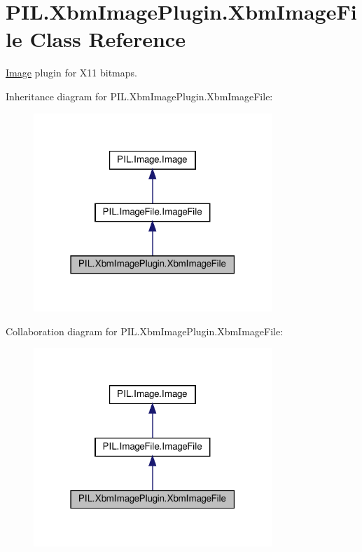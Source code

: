 \hypertarget{classPIL_1_1XbmImagePlugin_1_1XbmImageFile}{}\section{P\+I\+L.\+Xbm\+Image\+Plugin.\+Xbm\+Image\+File Class Reference}
\label{classPIL_1_1XbmImagePlugin_1_1XbmImageFile}


\hyperlink{namespacePIL_1_1Image}{Image} plugin for X11 bitmaps.  




Inheritance diagram for P\+I\+L.\+Xbm\+Image\+Plugin.\+Xbm\+Image\+File\+:
\nopagebreak
\begin{figure}[H]
\begin{center}
\leavevmode
\includegraphics[width=255pt]{classPIL_1_1XbmImagePlugin_1_1XbmImageFile__inherit__graph}
\end{center}
\end{figure}


Collaboration diagram for P\+I\+L.\+Xbm\+Image\+Plugin.\+Xbm\+Image\+File\+:
\nopagebreak
\begin{figure}[H]
\begin{center}
\leavevmode
\includegraphics[width=255pt]{classPIL_1_1XbmImagePlugin_1_1XbmImageFile__coll__graph}
\end{center}
\end{figure}
